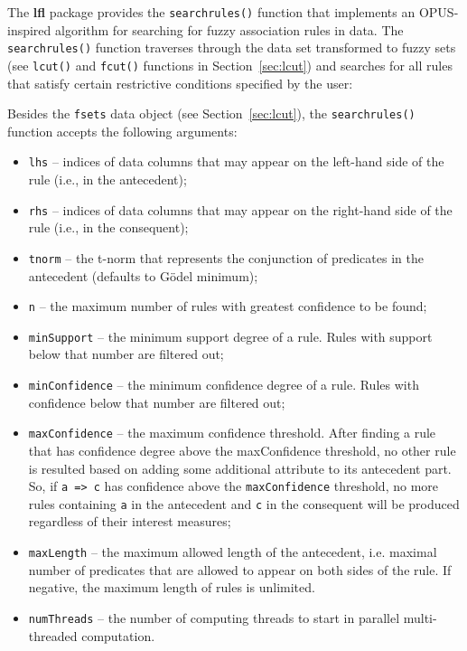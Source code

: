 \documentclass[review]{elsarticle}
\newcommand{\pkg}[1]{\textbf{#1}}
\newcommand{\code}[1]{\texttt{#1}}
\begin{document}
The \pkg{lfl} package provides the \code{searchrules()} function that implements an OPUS-inspired algorithm \citep{webb95opus} for searching for fuzzy association rules in data. The \code{searchrules()} function traverses through the data set transformed to fuzzy sets (see \code{lcut()} and \code{fcut()} functions in Section~\ref{sec:lcut}) and searches for all rules that satisfy certain restrictive conditions specified by the user:
%


Besides the \code{fsets} data object (see Section~\ref{sec:lcut}), the \code{searchrules()} function accepts the following arguments:
\begin{itemize}
    \item \code{lhs} -- indices of data columns that may appear on the left-hand side of the rule (i.e., in the antecedent);
    \item \code{rhs} -- indices of data columns that may appear on the right-hand side of the rule (i.e., in the consequent);
    \item \code{tnorm} -- the t-norm that represents the conjunction of predicates in the antecedent (defaults to G\"odel minimum);
    \item \code{n} -- the maximum number of rules with greatest confidence to be found;
    \item \code{minSupport} -- the minimum support degree of a rule. Rules with support below that number are filtered out;
    \item \code{minConfidence} -- the minimum confidence degree of a rule. Rules with confidence below that number are filtered out;
    \item \code{maxConfidence} -- the maximum confidence threshold. After finding a rule that has confidence degree above the maxConfidence threshold, no other rule is resulted based on adding some additional attribute to its antecedent part. So, if \code{a => c} has confidence above the \code{maxConfidence} threshold, no more rules containing \code{a} in the antecedent and \code{c} in the consequent will be produced regardless of their interest measures;
    \item \code{maxLength} -- the maximum allowed length of the antecedent, i.e. maximal number of predicates that are allowed to appear on both sides of the rule. If negative, the maximum length of rules is unlimited.
    \item \code{numThreads} -- the number of computing threads to start in parallel multi-threaded computation.
\end{itemize}
\end{document}
